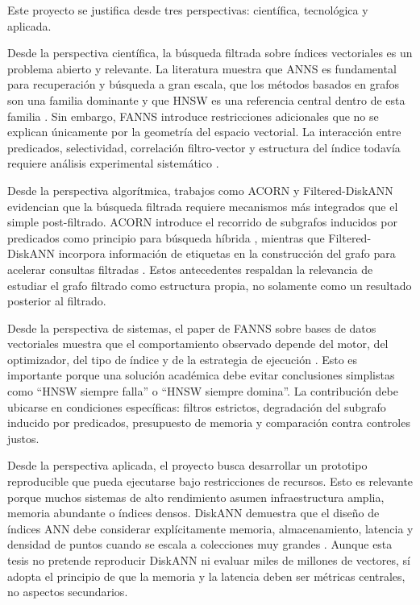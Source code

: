 Este proyecto se justifica desde tres perspectivas: científica, tecnológica y aplicada.

Desde la perspectiva científica, la búsqueda filtrada sobre índices vectoriales es un problema abierto y relevante. La literatura muestra que ANNS es fundamental para recuperación y búsqueda a gran escala, que los métodos basados en grafos son una familia dominante y que HNSW es una referencia central dentro de esta familia \parencite{malkov2020efficient,wang2021comprehensive}. Sin embargo, FANNS introduce restricciones adicionales que no se explican únicamente por la geometría del espacio vectorial. La interacción entre predicados, selectividad, correlación filtro-vector y estructura del índice todavía requiere análisis experimental sistemático \parencite{amanbayev2026filtered}.

Desde la perspectiva algorítmica, trabajos como ACORN y Filtered-DiskANN evidencian que la búsqueda filtrada requiere mecanismos más integrados que el simple post-filtrado. ACORN introduce el recorrido de subgrafos inducidos por predicados como principio para búsqueda híbrida \parencite{patel2024acorn}, mientras que Filtered-DiskANN incorpora información de etiquetas en la construcción del grafo para acelerar consultas filtradas \parencite{gollapudi2023filtered}. Estos antecedentes respaldan la relevancia de estudiar el grafo filtrado como estructura propia, no solamente como un resultado posterior al filtrado.

Desde la perspectiva de sistemas, el paper de FANNS sobre bases de datos vectoriales muestra que el comportamiento observado depende del motor, del optimizador, del tipo de índice y de la estrategia de ejecución \parencite{amanbayev2026filtered}. Esto es importante porque una solución académica debe evitar conclusiones simplistas como “HNSW siempre falla” o “HNSW siempre domina”. La contribución debe ubicarse en condiciones específicas: filtros estrictos, degradación del subgrafo inducido por predicados, presupuesto de memoria y comparación contra controles justos.

Desde la perspectiva aplicada, el proyecto busca desarrollar un prototipo reproducible que pueda ejecutarse bajo restricciones de recursos. Esto es relevante porque muchos sistemas de alto rendimiento asumen infraestructura amplia, memoria abundante o índices densos. DiskANN demuestra que el diseño de índices ANN debe considerar explícitamente memoria, almacenamiento, latencia y densidad de puntos cuando se escala a colecciones muy grandes \parencite{subramanya2019diskann}. Aunque esta tesis no pretende reproducir DiskANN ni evaluar miles de millones de vectores, sí adopta el principio de que la memoria y la latencia deben ser métricas centrales, no aspectos secundarios.

